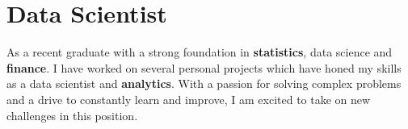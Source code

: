 
\section{Data Scientist}
\small{
    As a recent graduate with a strong foundation in \textbf{statistics}, data science and \textbf{finance}. I have worked on several personal projects which have honed my skills as a data scientist and \textbf{analytics}. With a passion for solving complex problems and a drive to constantly learn and improve, I am excited to take on new challenges in this position.
}